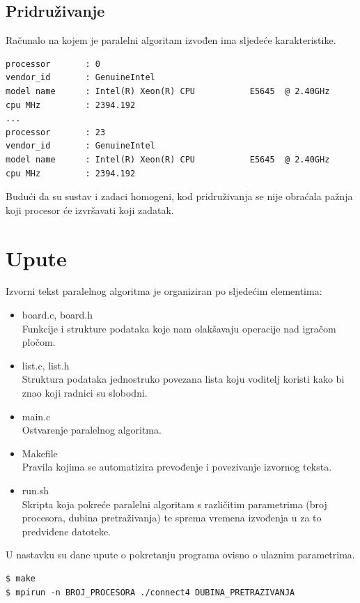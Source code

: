 \documentclass[11pt]{article}
\begin{document}
\subsection{Pridruživanje}
Računalo na kojem je paralelni algoritam izvođen ima sljedeće karakteristike.

\begin{lstlisting}[caption=cat /proc/cpuinfo]
processor       : 0
vendor_id       : GenuineIntel
model name      : Intel(R) Xeon(R) CPU           E5645  @ 2.40GHz
cpu MHz         : 2394.192
...
processor       : 23
vendor_id       : GenuineIntel
model name      : Intel(R) Xeon(R) CPU           E5645  @ 2.40GHz
cpu MHz         : 2394.192
\end{lstlisting}

Budući da su sustav i zadaci homogeni, kod pridruživanja se nije obraćala pažnja koji procesor će izvršavati koji zadatak.

\section{Upute}
Izvorni tekst paralelnog algoritma je organiziran po sljedećim elementima:
\begin{itemize}
\item board.c, board.h\\ Funkcije i strukture podataka koje nam olakšavaju operacije nad igračom pločom.
\item list.c, list.h\\ Struktura podataka jednostruko povezana lista koju voditelj koristi kako bi znao koji radnici su slobodni.
\item main.c\\ Ostvarenje paralelnog algoritma.
\item Makefile\\ Pravila kojima se automatizira prevođenje i povezivanje izvornog teksta.
\item run.sh\\ Skripta koja pokreće paralelni algoritam s različitim parametrima (broj procesora, dubina pretraživanja) te sprema vremena izvođenja u za to predviđene datoteke.
\end{itemize}

U nastavku su dane upute o pokretanju programa ovisno o ulaznim parametrima.

\begin{lstlisting}[caption=Prevođenje i pokretanje paralelnog algoritma]
$ make
$ mpirun -n BROJ_PROCESORA ./connect4 DUBINA_PRETRAZIVANJA
\end{lstlisting}
\end{document}

